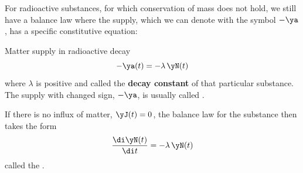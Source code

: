 \label{nsec:matter_const_radioactive}

For radioactive substances, for which conservation of mass does not hold, we still have a balance law where the {supply}, which we can denote with the symbol $-\ya$, has a specific constitutive equation:
\begin{definition}{Matter supply in radioactive decay}
  \begin{equation*}
  -\ya(t) =  -\lambda\,\yN(t)
\end{equation*}
where $\lambda$ is positive and called the \textbf{decay constant} of that particular substance. The supply with changed sign, $-\ya$, is usually called .

If there is no influx of matter, $\yJ(t)=0$, the balance law for the substance then takes the form
  \begin{equation*}
  \frac{\di\yN(t)}{\di t} =  -\lambda\,\yN(t)
\end{equation*}
called the .
\end{definition}
%

\label{nsec:matter_applic}

